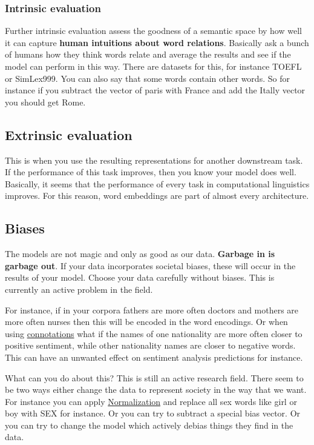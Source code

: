 \documentclass[
  11pt,
  british,
]{article}
\begin{document}
\hypertarget{intrinsic-evaluation}{%
\subsubsection{Intrinsic evaluation}\label{intrinsic-evaluation}}

Further intrinsic evaluation assess the goodness of a semantic space by
how well it can capture \textbf{human intuitions about word relations}.
Basically ask a bunch of humans how they think words relate and average
the results and see if the model can perform in this way. There are
datasets for this, for instance TOEFL or SimLex999. You can also say
that some words contain other words. So for instance if you subtract the
vector of paris with France and add the Itally vector you should get
Rome.

\hypertarget{extrinsic-evaluation}{%
\subsection{Extrinsic evaluation}\label{extrinsic-evaluation}}

This is when you use the resulting representations for another
downstream task. If the performance of this task improves, then you know
your model does well. Basically, it seems that the performance of every
task in computational linguistics improves. For this reason, word
embeddings are part of almost every architecture.

\hypertarget{biases}{%
\subsection{Biases}\label{biases}}

The models are not magic and only as good as our data. \textbf{Garbage
in is garbage out}. If your data incorporates societal biases, these
will occur in the results of your model. Choose your data carefully
without biases. This is currently an active problem in the field.

For instance, if in your corpora fathers are more often doctors and
mothers are more often nurses then this will be encoded in the word
encodings. Or when using \href{Connotations.md}{connotations} what if
the names of one nationality are more often closer to positive
sentiment, while other nationality names are closer to negative words.
This can have an unwanted effect on sentiment analysis predictions for
instance.

What can you do about this? This is still an active research field.
There seem to be two ways either change the data to represent society in
the way that we want. For instance you can apply
\href{../Data/Normalization.md}{Normalization} and replace all sex words
like girl or boy with SEX for instance. Or you can try to subtract a
special bias vector. Or you can try to change the model which actively
debias things they find in the data.
\end{document}
